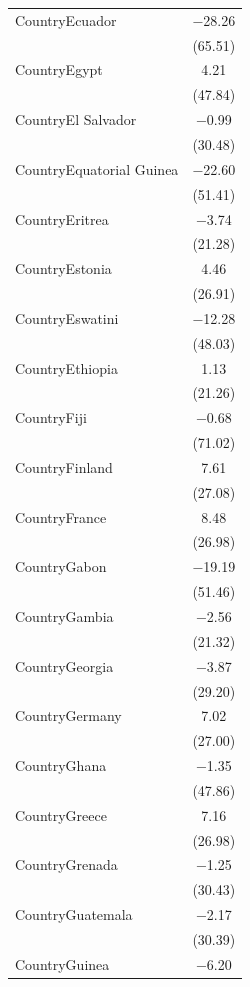 \documentclass[
  letterpaper,
  DIV=11,
  numbers=noendperiod]{scrartcl}
\begin{document}
\begin{table}
{\begin{tabular}[t]{lc}
CountryEcuador & \num{-28.26}\\
 & (\num{65.51})\\
CountryEgypt & \num{4.21}\\
 & (\num{47.84})\\
CountryEl Salvador & \num{-0.99}\\
 & (\num{30.48})\\
CountryEquatorial Guinea & \num{-22.60}\\
 & (\num{51.41})\\
CountryEritrea & \num{-3.74}\\
 & (\num{21.28})\\
CountryEstonia & \num{4.46}\\
 & \vphantom{1} (\num{26.91})\\
CountryEswatini & \num{-12.28}\\
 & \vphantom{1} (\num{48.03})\\
CountryEthiopia & \num{1.13}\\
 & \vphantom{1} (\num{21.26})\\
CountryFiji & \num{-0.68}\\
 & (\num{71.02})\\
CountryFinland & \num{7.61}\\
 & (\num{27.08})\\
CountryFrance & \num{8.48}\\
 & \vphantom{2} (\num{26.98})\\
CountryGabon & \num{-19.19}\\
 & (\num{51.46})\\
CountryGambia & \num{-2.56}\\
 & (\num{21.32})\\
CountryGeorgia & \num{-3.87}\\
 & \vphantom{1} (\num{29.20})\\
CountryGermany & \num{7.02}\\
 & \vphantom{2} (\num{27.00})\\
CountryGhana & \num{-1.35}\\
 & (\num{47.86})\\
CountryGreece & \num{7.16}\\
 & \vphantom{1} (\num{26.98})\\
CountryGrenada & \num{-1.25}\\
 & \vphantom{1} (\num{30.43})\\
CountryGuatemala & \num{-2.17}\\
 & (\num{30.39})\\
CountryGuinea & \num{-6.20}\\

\end{tabular}}
\end{table}
\end{document}
